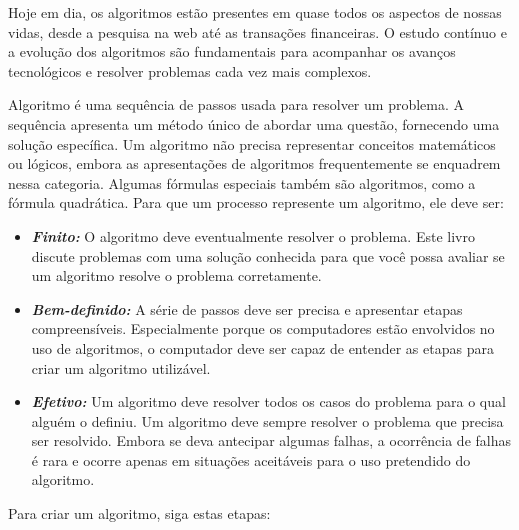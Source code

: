 \documentclass[a4paper, 12pt, onecolumn,singlespacing]{article}
\begin{document}
	Hoje em dia, os algoritmos estão presentes em quase todos os aspectos de nossas vidas, desde a pesquisa na web até as transações financeiras. O estudo contínuo e a evolução dos algoritmos são fundamentais para acompanhar os avanços tecnológicos e resolver problemas cada vez mais complexos.
	
	Algoritmo é uma sequência de passos usada para resolver um problema. A sequência apresenta um método único de abordar uma questão, fornecendo uma solução específica. Um algoritmo não precisa representar conceitos matemáticos ou lógicos, embora as apresentações de algoritmos frequentemente se enquadrem nessa categoria. Algumas fórmulas especiais também são algoritmos, como a fórmula quadrática. Para que um processo represente um algoritmo, ele deve ser:
	
	\begin{itemize}
		\item \textbf{\textit{Finito:}} O algoritmo deve eventualmente resolver o problema. Este livro discute problemas com uma solução conhecida para que você possa avaliar se um algoritmo resolve o problema corretamente.
		\item \textbf{\textit{Bem-definido:}} A série de passos deve ser precisa e apresentar etapas compreensíveis. Especialmente porque os computadores estão envolvidos no uso de algoritmos, o computador deve ser capaz de entender as etapas para criar um algoritmo utilizável.
		\item \textbf{\textit{Efetivo:}} Um algoritmo deve resolver todos os casos do problema para o qual alguém o definiu. Um algoritmo deve sempre resolver o problema que precisa ser resolvido. Embora se deva antecipar algumas falhas, a ocorrência de falhas é rara e ocorre apenas em situações aceitáveis para o uso pretendido do algoritmo.
	\end{itemize}
	
	Para criar um algoritmo, siga estas etapas:
	
\end{document}
